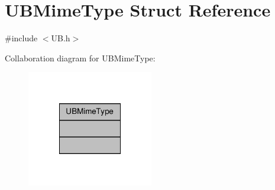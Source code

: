 \hypertarget{struct_u_b_mime_type}{\section{U\-B\-Mime\-Type Struct Reference}
\label{df/da5/struct_u_b_mime_type}
}


{\ttfamily \#include $<$U\-B.\-h$>$}



Collaboration diagram for U\-B\-Mime\-Type\-:
\nopagebreak
\begin{figure}[H]
\begin{center}
\leavevmode
\includegraphics[width=156pt]{d8/de5/struct_u_b_mime_type__coll__graph}
\end{center}
\end{figure}
